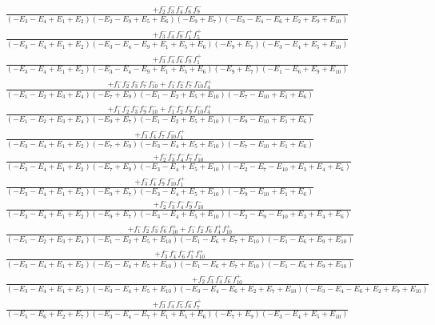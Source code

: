 \documentclass{article}
\begin{document}
\[\begin{array}{rcl}
\frac{+f_{2}^{-}f_{3}^{-}f_{4}^{-}f_{6}^{-}f_{9}^{-}}{(-E_{3}-E_{4}+E_{1}+E_{2})(-E_{2}-E_{9}+E_{5}+E_{6})(-E_{9}+E_{7})(-E_{3}-E_{4}-E_{6}+E_{2}+E_{9}+E_{10})}\\
\frac{+f_{3}^{-}f_{4}^{-}f_{9}^{-}f_{1}^{+}f_{5}^{+}}{(-E_{3}-E_{4}+E_{1}+E_{2})(-E_{3}-E_{4}-E_{9}+E_{1}+E_{5}+E_{6})(-E_{9}+E_{7})(-E_{3}-E_{4}+E_{5}+E_{10})}\\
\frac{+f_{3}^{-}f_{4}^{-}f_{6}^{-}f_{9}^{-}f_{1}^{+}}{(-E_{3}-E_{4}+E_{1}+E_{2})(-E_{3}-E_{4}-E_{9}+E_{1}+E_{5}+E_{6})(-E_{9}+E_{7})(-E_{1}-E_{6}+E_{9}+E_{10})}\\
\frac{+f_{1}^{-}f_{2}^{-}f_{3}^{-}f_{7}^{-}f_{10}^{-}+f_{1}^{-}f_{2}^{-}f_{7}^{-}f_{10}^{-}f_{4}^{+}}{(-E_{1}-E_{2}+E_{3}+E_{4})(-E_{7}+E_{9})(-E_{1}-E_{2}+E_{5}+E_{10})(-E_{7}-E_{10}+E_{1}+E_{6})}\\
\frac{+f_{1}^{-}f_{2}^{-}f_{3}^{-}f_{9}^{-}f_{10}^{-}+f_{1}^{-}f_{2}^{-}f_{9}^{-}f_{10}^{-}f_{4}^{+}}{(-E_{1}-E_{2}+E_{3}+E_{4})(-E_{9}+E_{7})(-E_{1}-E_{2}+E_{5}+E_{10})(-E_{9}-E_{10}+E_{1}+E_{6})}\\
\frac{+f_{3}^{-}f_{4}^{-}f_{7}^{-}f_{10}^{-}f_{1}^{+}}{(-E_{3}-E_{4}+E_{1}+E_{2})(-E_{7}+E_{9})(-E_{3}-E_{4}+E_{5}+E_{10})(-E_{7}-E_{10}+E_{1}+E_{6})}\\
\frac{+f_{2}^{-}f_{3}^{-}f_{4}^{-}f_{7}^{-}f_{10}^{-}}{(-E_{3}-E_{4}+E_{1}+E_{2})(-E_{7}+E_{9})(-E_{3}-E_{4}+E_{5}+E_{10})(-E_{2}-E_{7}-E_{10}+E_{3}+E_{4}+E_{6})}\\
\frac{+f_{3}^{-}f_{4}^{-}f_{9}^{-}f_{10}^{-}f_{1}^{+}}{(-E_{3}-E_{4}+E_{1}+E_{2})(-E_{9}+E_{7})(-E_{3}-E_{4}+E_{5}+E_{10})(-E_{9}-E_{10}+E_{1}+E_{6})}\\
\frac{+f_{2}^{-}f_{3}^{-}f_{4}^{-}f_{9}^{-}f_{10}^{-}}{(-E_{3}-E_{4}+E_{1}+E_{2})(-E_{9}+E_{7})(-E_{3}-E_{4}+E_{5}+E_{10})(-E_{2}-E_{9}-E_{10}+E_{3}+E_{4}+E_{6})}\\
\frac{+f_{1}^{-}f_{2}^{-}f_{3}^{-}f_{6}^{-}f_{10}^{+}+f_{1}^{-}f_{2}^{-}f_{6}^{-}f_{4}^{+}f_{10}^{+}}{(-E_{1}-E_{2}+E_{3}+E_{4})(-E_{1}-E_{2}+E_{5}+E_{10})(-E_{1}-E_{6}+E_{7}+E_{10})(-E_{1}-E_{6}+E_{9}+E_{10})}\\
\frac{+f_{3}^{-}f_{4}^{-}f_{6}^{-}f_{1}^{+}f_{10}^{+}}{(-E_{3}-E_{4}+E_{1}+E_{2})(-E_{3}-E_{4}+E_{5}+E_{10})(-E_{1}-E_{6}+E_{7}+E_{10})(-E_{1}-E_{6}+E_{9}+E_{10})}\\
\frac{+f_{2}^{-}f_{3}^{-}f_{4}^{-}f_{6}^{-}f_{10}^{+}}{(-E_{3}-E_{4}+E_{1}+E_{2})(-E_{3}-E_{4}+E_{5}+E_{10})(-E_{3}-E_{4}-E_{6}+E_{2}+E_{7}+E_{10})(-E_{3}-E_{4}-E_{6}+E_{2}+E_{9}+E_{10})}\\
\frac{+f_{3}^{-}f_{4}^{-}f_{5}^{-}f_{6}^{-}f_{7}^{+}}{(-E_{5}-E_{6}+E_{2}+E_{7})(-E_{3}-E_{4}-E_{7}+E_{1}+E_{5}+E_{6})(-E_{7}+E_{9})(-E_{3}-E_{4}+E_{5}+E_{10})}\\

\end{array}\]
\end{document}
